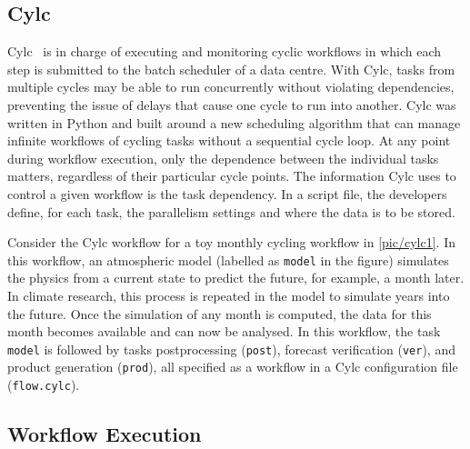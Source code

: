 \documentclass{superfri}
\begin{document}
\subsection{Cylc}

Cylc~\cite{8675433} is in charge of executing and monitoring cyclic workflows in which each step is submitted to the batch scheduler of a data centre.
With Cylc, tasks from multiple cycles may be able to run concurrently without violating dependencies, preventing the issue of delays that cause one cycle to run into another.
Cylc was written in Python and built around a new scheduling algorithm that can manage infinite workflows of cycling tasks without a sequential cycle loop.
At any point during workflow execution, only the dependence between the individual tasks matters, regardless of their particular cycle points.
The information Cylc uses to control a given workflow is the task dependency.
In a script file, the developers define, for each task, the parallelism settings and where the data is to be stored.


Consider the Cylc workflow for a toy monthly cycling workflow in \cref{pic/cylc1}.
In this workflow, an atmospheric model (labelled as \texttt{model} in the figure) simulates the physics from a current state to predict the future, for example, a month later.
In climate research, this process is repeated in the model to simulate years into the future.
Once the simulation of any month is computed, the data for this month becomes available and can now be analysed.
In this workflow, the task \texttt{model} is followed by tasks postprocessing (\texttt{post}), forecast verification (\texttt{ver}), and product generation (\texttt{prod}), all specified as a workflow in a Cylc configuration file (\texttt{flow.cylc}).

\subsection{Workflow Execution}
\end{document}
